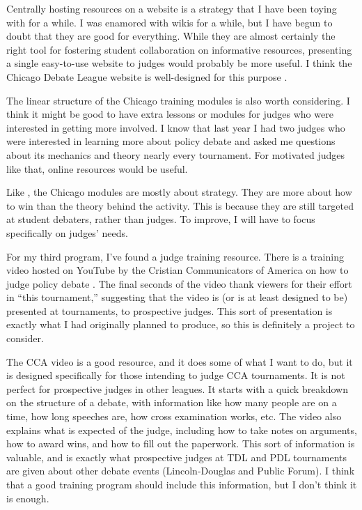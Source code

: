\documentclass[man,12pt]{apa6}
\begin{document}
Centrally hosting resources on a website is a strategy that I have been toying
with for a while. I was enamored with wikis for a while, but I have begun to
doubt that they are good for everything. While they are almost certainly the
right tool for fostering student collaboration on informative resources,
presenting a single easy-to-use website to judges would probably be more
useful.
I think the Chicago Debate League website is well-designed for this purpose
\cite{ChicagoURL}.

The linear structure of the Chicago training modules is also worth considering.
I think it might be good to have extra lessons or modules for judges who were
interested in getting more involved.
I know that last year I had two judges who were interested in learning more
about policy debate and asked me questions about its mechanics and theory
nearly every tournament. For motivated judges like that, online resources would
be useful.

Like \citet{Bellon06}, the Chicago modules are mostly about strategy. They are
more about how to win than the theory behind the activity. This is because they
are still targeted at student debaters, rather than judges. To improve, I will
have to focus specifically on judges' needs.


For my third program, I've found a judge training resource. There is a training
video hosted on YouTube by the Cristian Communicators of America on how to
judge policy debate \cite{CCAvideo}. The final seconds of the video thank
viewers for their effort in ``this tournament,'' suggesting that the video is
(or is at least designed to be) presented at tournaments, to prospective
judges. This sort of presentation is exactly what I had originally planned to
produce, so this is definitely a project to consider.

The CCA video is a good resource, and it does some of what I want to do, but it
is designed specifically for those intending to judge CCA tournaments. It is
not perfect for prospective judges in other leagues. It starts with a quick
breakdown on the structure of a debate, with information like how many people
are on a time, how long speeches are, how cross examination works, etc. The
video also explains what is expected of the judge, including how to take notes
on arguments, how to award wins, and how to fill out the paperwork. This sort
of information is valuable, and is exactly what prospective judges at TDL and
PDL tournaments are given about other debate events (Lincoln-Douglas and Public
Forum). I think that a good training program should include this information,
but I don't think it is enough.
\end{document}
